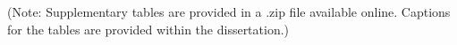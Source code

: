 \abstract
 (Note:
Supplementary tables are provided in a .zip file available
online. Captions for the tables are provided within the dissertation.)
